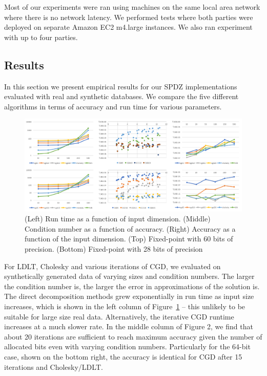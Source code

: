 \documentclass{article}
\begin{document}
Most of our experiments were ran using machines on the same local area network where there is no network latency. We performed tests where both parties were deployed on separate Amazon EC2 m4.large instances.
We also ran experiment with up to four parties.


\subsection{Results}

In this section we present empirical results for our SPDZ implementations evaluated with real and synthetic databases. We compare the five different algorithms in terms of accuracy and run time for various parameters. 

\begin{figure}[h!]
\centering
  \includegraphics[scale=0.4]{allregression.png}
    \caption{(Left) Run time as a function of input dimension. (Middle) Condition number as a function of accuracy. (Right) Accuracy as a function of the input dimension. (Top) Fixed-point with 60 bits of precision. (Bottom) Fixed-point with 28 bits of precision}
   \label{fig:result1}   
\end{figure}

For LDLT, Cholesky and various iterations of CGD, we evaluated on synthetically generated data of varying sizes and condition numbers. The larger the condition number is, the larger the error in approximations of the solution is. The direct decomposition methods grew exponentially in run time as input size increases, which is shown in the left column of Figure~\ref{fig:result1} -- this unlikely to be suitable for large size real data. Alternatively, the iterative CGD runtime increases at a much slower rate. In the middle column of Figure 2, we find that about 20 iterations are sufficient to reach maximum accuracy given the number of allocated bits even with varying condition numbers. Particularly for the 64-bit case, shown on the bottom right, the accuracy is identical for CGD after 15 iterations and Cholesky/LDLT.
\end{document}
